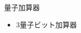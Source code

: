 \begin{frame}[t,fragile]{量子加算器}
  \begin{itemize}
  \item 3量子ビット加算器
    \begin{center}
    \end{center}
  \end{itemize}
\end{frame}
